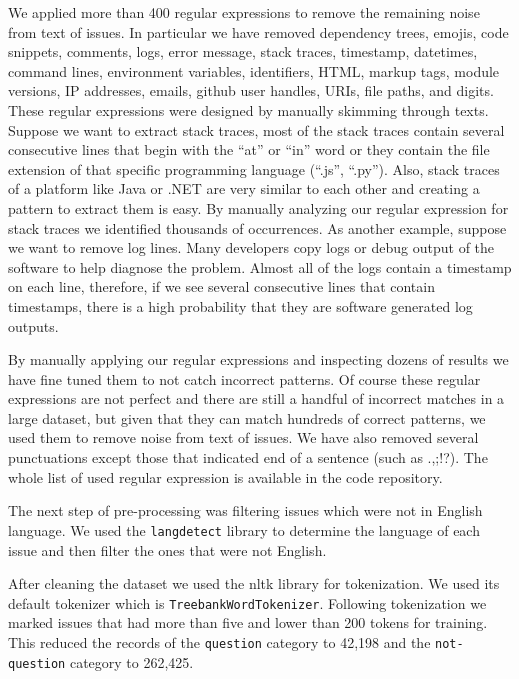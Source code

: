 \documentclass[conference]{IEEEtran}
\begin{document}
We applied more than 400 regular expressions to remove the remaining noise from text of issues. In 
particular we have removed dependency trees, emojis, code snippets, comments, logs,
error message, stack traces, timestamp, datetimes, command lines, environment variables, identifiers,
HTML, markup tags, module versions, IP addresses, emails, github user handles, URIs, file paths, and digits.
These regular expressions were designed by manually skimming through texts. Suppose we want to extract
stack traces, most of the stack traces contain several consecutive lines that begin with 
the ``at'' or ``in'' word or they contain the file extension of that specific 
programming language (``.js'', ``.py''). Also, stack traces of a platform like Java or .NET are 
very similar to each other and creating a pattern to extract them is easy.
By manually analyzing our regular expression for stack traces we identified thousands
of occurrences. As another example, suppose we want to remove log lines. Many developers copy logs or debug
output of the software to help diagnose the problem. Almost all of the logs contain a timestamp on
each line, therefore, if we see several consecutive lines that contain timestamps, there is 
a high probability that they are software generated log outputs.

By manually applying our regular expressions and inspecting dozens of results we have fine tuned 
them to not catch incorrect patterns. Of course these regular expressions are not perfect and there are 
still a handful of incorrect matches in a large dataset, but given that they can match hundreds of correct patterns, 
we used them to remove noise from text of issues. We have also removed several punctuations except 
those that indicated end of a sentence (such as .,;!?). The whole list of used regular expression is available
in the code repository.

The next step of pre-processing was filtering issues which were not in English language. We used 
the \verb|langdetect| \cite{web:langdetect} library to determine the language of each issue 
and then filter the ones that were not English.

After cleaning the dataset we used the nltk library for tokenization. We used its default tokenizer 
which is \verb|TreebankWordTokenizer|. Following tokenization we marked issues that had more than 
five and lower than 200 tokens for training. This reduced the records of the \verb|question| category to
42,198 and the \verb|not-question| category to 262,425.
\end{document}
